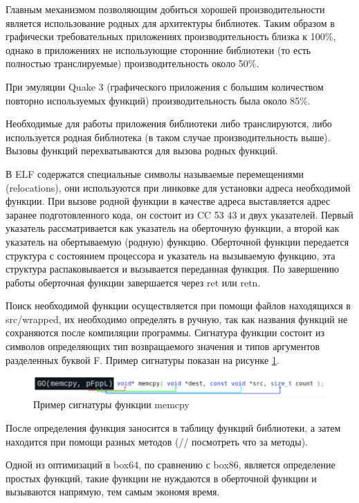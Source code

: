 Главным механизмом позволяющим добиться хорошей производительности является использование родных для архитектуры библиотек. Таким образом в графически требовательных приложениях производительность близка к 100\%, однако в приложениях не использующие сторонние библиотеки (то есть полностью транслируемые) производительность около 50\%.

При эмуляции Quake 3 (графического приложения с большим количеством повторно используемых функций) производительность была около 85\%.

Необходимые для работы приложения библиотеки либо транслируются, либо используется родная библиотека (в таком случае производительность выше). Вызовы функций перехватываются для вызова родных функций. 

В ELF содержатся специальные символы называемые перемещениями (relocations), они используются при линковке для установки адреса необходимой функции. При вызове родной функции в качестве адреса выставляется адрес заранее подготовленного кода, он состоит из CC 53 43 и двух указателей. Первый указатель рассматривается как указатель на оберточную функции, а второй как указатель на обертываемую (родную) функцию. Оберточной функции передается структура с состоянием процессора и указатель на вызываемую функцию, эта структура распаковывается и вызывается переданная функция. По завершению работы оберточная функции завершается через ret или retn.

Поиск необходимой функции осуществляется при помощи файлов находящихся в src/wrapped, их необходимо определять в ручную, так как названия функций не сохраняются после компиляции программы. Сигнатура функции состоит из символов определяющих тип возвращаемого значения и типов аргументов разделенных буквой F. Пример сигнатуры показан на рисунке \ref{fig:box64sig}.

\begin{figure}[hbtp]
	\centering
	\includegraphics[width=\textwidth]{img/box64_sig.png}
	\caption{Пример сигнатуры функции memcpy}
	\label{fig:box64sig}
\end{figure}

После определения функция заносится в таблицу функций библиотеки, а затем находится при помощи разных методов (// посмотреть что за методы).

Одной из оптимизаций в box64, по сравнению с box86, является определение простых функций, такие функции не нуждаются в оберточной функции и вызываются напрямую, тем самым экономя время.  \cite{box64_deep}

